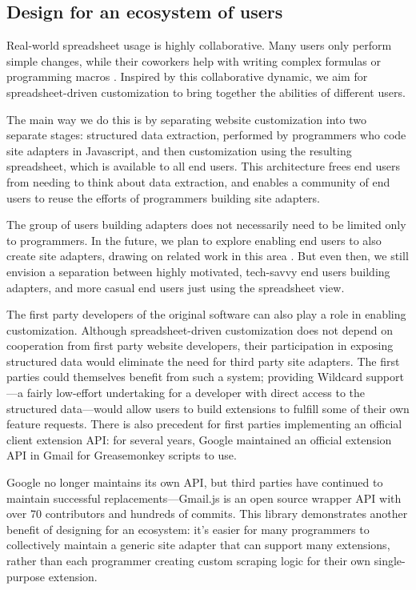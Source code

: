 \documentclass[english,submission]{programming}
\begin{document}
\hypertarget{design-for-an-ecosystem-of-users}{%
\subsection{Design for an ecosystem of
users}\label{design-for-an-ecosystem-of-users}}

Real-world spreadsheet usage is highly collaborative. Many users only
perform simple changes, while their coworkers help with writing complex
formulas or programming macros \autocite{nardi1990}. Inspired by this
collaborative dynamic, we aim for spreadsheet-driven customization to
bring together the abilities of different users.

The main way we do this is by separating website customization into two
separate stages: structured data extraction, performed by programmers
who code site adapters in Javascript, and then customization using the
resulting spreadsheet, which is available to all end users. This
architecture frees end users from needing to think about data
extraction, and enables a community of end users to reuse the efforts of
programmers building site adapters.

The group of users building adapters does not necessarily need to be
limited only to programmers. In the future, we plan to explore enabling
end users to also create site adapters, drawing on related work in this
area \autocite{chasins2018,huynh2006}. But even then, we still envision
a separation between highly motivated, tech-savvy end users building
adapters, and more casual end users just using the spreadsheet view.

The first party developers of the original software can also play a role
in enabling customization. Although spreadsheet-driven customization
does not depend on cooperation from first party website developers,
their participation in exposing structured data would eliminate the need
for third party site adapters. The first parties could themselves
benefit from such a system; providing Wildcard support---a fairly
low-effort undertaking for a developer with direct access to the
structured data---would allow users to build extensions to fulfill some
of their own feature requests. There is also precedent for first parties
implementing an official client extension API: for several years, Google
maintained an official extension API in Gmail for Greasemonkey scripts
to use.

Google no longer maintains its own API, but third parties have continued
to maintain successful replacements---Gmail.js \autocite{talwar2019} is
an open source wrapper API with over 70 contributors and hundreds of
commits. This library demonstrates another benefit of designing for an
ecosystem: it's easier for many programmers to collectively maintain a
generic site adapter that can support many extensions, rather than each
programmer creating custom scraping logic for their own single-purpose
extension.
\end{document}
